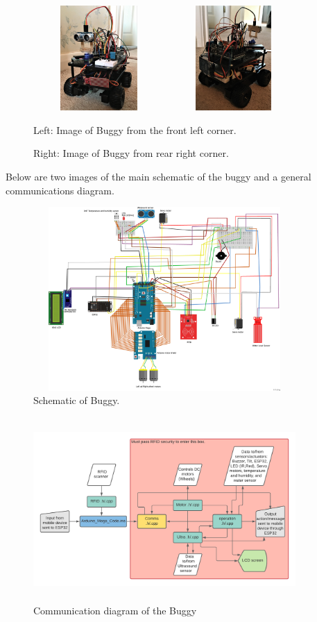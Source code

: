 \documentclass[8pt, a4paper]{article}
\begin{document}
\begin{figure}[H]
\centering
\includegraphics[height=4.0cm, width=5.0cm]{buggy_front}
\includegraphics[height=4.0cm, width=5.0cm]{Buggy_rear}
\caption{Left: Image of Buggy from the front left corner.}
\caption{Right: Image of Buggy from rear right corner.}
\end{figure} 


Below are two images of the main schematic of the buggy and a general communications diagram. 


\begin{figure}[H]
	\centering
\includegraphics[height=7cm, width=10.0cm]{schematic}
\caption{Schematic of Buggy.}
\end{figure}

\begin{figure}[H]
	\centering
\includegraphics[height=7cm, width=10.0cm]{Arch}
\caption{Communication diagram of the Buggy}
\end{figure}
\end{document}
